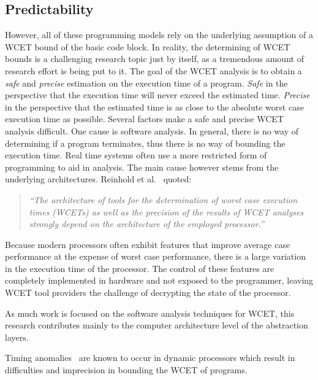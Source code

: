 \subsection{Predictability}
\label{bookmark:timing_anomalies}


However, all of these programming models rely on the underlying assumption of a WCET bound of the basic code block. 
In reality, the determining of WCET bounds is a challenging research topic just by itself, as a tremendous amount of research effort is being put to it\cite{Wilhelm2008survey}. 
The goal of the WCET analysis is to obtain a \textit{safe} and \textit{precise} estimation on the execution time of a program. 
\textit{Safe} in the perspective that the execution time will never exceed the estimated time. 
\textit{Precise} in the perspective that the estimated time is as close to the absolute worst case execution time as possible. 
Several factors make a safe and precise WCET analysis difficult. 
One cause is software analysis. 
In general, there is no way of determining if a program terminates, thus there is no way of bounding the execution time. 
Real time systems often use a more restricted form of programming to aid in analysis. 
The main cause however stems from the underlying architectures. 
Reinhold et al.~\cite{Heckmann2003processor} quoted:
\begin{quote} \textit{ ``The architecture of tools for the
    determination of worst case execution times (WCETs) as well as the
    precision of the results of WCET analyses strongly depend on the
    architecture of the employed processor.''}
\end {quote} 
Because modern processors often exhibit features that improve average case performance at the expense of worst case performance, there is a large variation in the execution time of the
processor. 
The control of these features are completely implemented in hardware and not exposed to the programmer, leaving WCET tool providers the challenge of decrypting the state of the processor. 

As much work is focused on the software analysis techniques for WCET, this research contributes mainly to the computer architecture level of the abstraction layers. 




  
  Timing anomalies~\cite{Reineke06adefinition,Lundqvist1999} are known to occur in dynamic processors which result in difficulties and imprecision in
bounding the WCET of programs.

